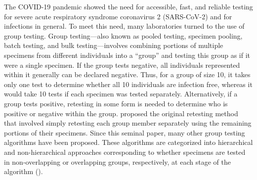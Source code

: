 \noindent The COVID-19 pandemic showed the need for accessible, fast,
and reliable testing for severe acute respiratory syndrome coronavirus
2 (SARS-CoV-2) and for infections in general. To meet this need,
many laboratories turned to the use of group testing. Group testing---also 
known as pooled testing, specimen pooling, batch testing, and
bulk testing---involves combining portions of multiple specimens from
different individuals into a ``group'' and testing this group as
if it were a single specimen. If the group tests negative, all individuals
represented within it generally can be declared negative. Thus, for
a group of size 10, it takes only one test to determine whether all 10 individuals
are infection free, whereas it would take 10 tests if each specimen
was tested separately. Alternatively, if a group tests positive,
retesting in some form is needed to determine who is positive or negative
within the group. \citet{dorfman1943detection} proposed the original
retesting method that involved simply retesting each group member
separately using the remaining portions of their specimens. Since
this seminal paper, many other group testing algorithms have been
proposed. These algorithms are categorized into hierarchical and non-hierarchical
approaches corresponding to whether specimens are tested in non-overlapping
or overlapping groups, respectively, at each stage of the algorithm
(\citealt{hitt2019objective}).

